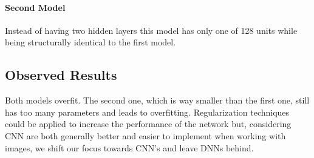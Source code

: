 \paragraph{Second Model}
Instead of having two hidden layers this model has only one of 128 units while being structurally identical to the first model.

\subsection{Observed Results}

Both models overfit. The second one, which is way smaller than the first one, still has too many parameters and leads to overfitting.
Regularization techniques could be applied to increase the performance of the network but, considering CNN are both generally
better and easier to implement when working with images, we shift our focus towards CNN's and leave DNNs behind.
